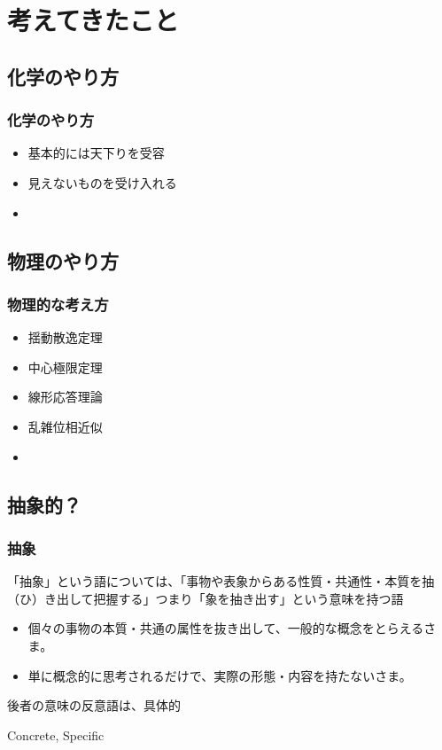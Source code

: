 \documentclass[12pt, dvipdfmx]{beamer}
\begin{document}
\section{考えてきたこと}
\subsection{化学のやり方}
\begin{frame}
    \frametitle{化学のやり方}
    \begin{itemize}
        \item 基本的には天下りを受容
        \item 見えないものを受け入れる
        \item 
    \end{itemize}
\end{frame}
    
\subsection{物理のやり方}
\begin{frame}
    \frametitle{物理的な考え方}
    \begin{itemize}
        \item 揺動散逸定理
        \item 中心極限定理
        \item 線形応答理論
        \item 乱雑位相近似
        \item 
    \end{itemize}
\end{frame}

\subsection{抽象的？}
\begin{frame}
    \frametitle{抽象}

    「抽象」という語については、「事物や表象からある性質・共通性・本質を抽（ひ）き出して把握する」つまり「象を抽き出す」という意味を持つ語


    \begin{itemize}
        \item 個々の事物の本質・共通の属性を抜き出して、一般的な概念をとらえるさま。
        \item 単に概念的に思考されるだけで、実際の形態・内容を持たないさま。
    \end{itemize}

    後者の意味の反意語は、具体的

    Concrete, Specific

\end{frame}
\end{document}
